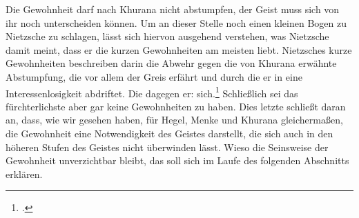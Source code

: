 \documentclass[12pt, a4paper, openany]{report}
\begin{document}
Die Gewohnheit darf nach Khurana nicht abstumpfen, der Geist muss sich von ihr noch unterscheiden können. 
Um an dieser Stelle noch einen kleinen Bogen zu Nietzsche zu schlagen, lässt sich hiervon ausgehend verstehen, was Nietzsche damit meint, dass er die kurzen Gewohnheiten am meisten liebt.
Nietzsches kurze Gewohnheiten beschreiben darin die Abwehr gegen die von Khurana erwähnte Abstumpfung, die vor allem der Greis erfährt und durch die er in eine Interessenlosigkeit abdriftet.
Die  dagegen  er:  sich.\footcite[][§295, S. 535. Er verwendet sogar eine ähnliche Metapher, wie Hegel: der Tod und die sich verdickende Lebensluft.]{nietzsche_morgenrote_1999}
Schließlich sei das fürchterlichste aber gar keine Gewohnheiten zu haben.
Dies letzte schließt daran an, dass, wie wir gesehen haben, für Hegel, Menke und Khurana gleichermaßen, die Gewohnheit eine Notwendigkeit des Geistes darstellt, die sich auch in den höheren Stufen des Geistes nicht überwinden lässt. 
Wieso die Seinsweise der Gewohnheit unverzichtbar bleibt, das soll sich im Laufe des folgenden Abschnitts erklären.
\end{document}
